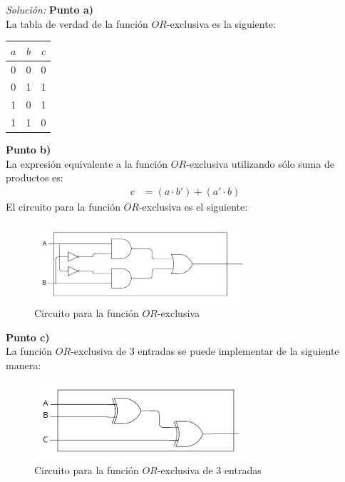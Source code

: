 \documentclass{article}
\newenvironment{solution}
    {\textit{Solución:}}
    {}
\begin{document}
\begin{solution}
\textbf{Punto a)}\\
La tabla de verdad de la función $OR$-exclusiva es la siguiente:
\begin{table}[H]
    \centering
    \begin{tabular}{|c|c|c|}
    \hline
    $a$ & $b$ & $c$ \\ \hline
    0   & 0   & 0   \\ \hline
    0   & 1   & 1   \\ \hline
    1   & 0   & 1   \\ \hline
    1   & 1   & 0   \\ \hline
    \end{tabular}
\end{table}

\textbf{Punto b)}\\
La expresión equivalente a la función $OR$-exclusiva utilizando sólo suma de productos es:
\begin{align*}
    c &= (a \cdot b') + (a' \cdot b)
\end{align*}
El circuito para la función $OR$-exclusiva es el siguiente:
\begin{figure}[H]
    \centering
    \includegraphics[width=0.7\textwidth]{tp02fig5.png}
    \caption{Circuito para la función $OR$-exclusiva}
\end{figure}

\textbf{Punto c)}\\
La función $OR$-exclusiva de 3 entradas se puede implementar de la siguiente manera:
\begin{figure}[H]
    \centering
    \includegraphics[width=0.7\textwidth]{tp02fig6.png}
    \caption{Circuito para la función $OR$-exclusiva de 3 entradas}
\end{figure}
\end{solution}
\end{document}
